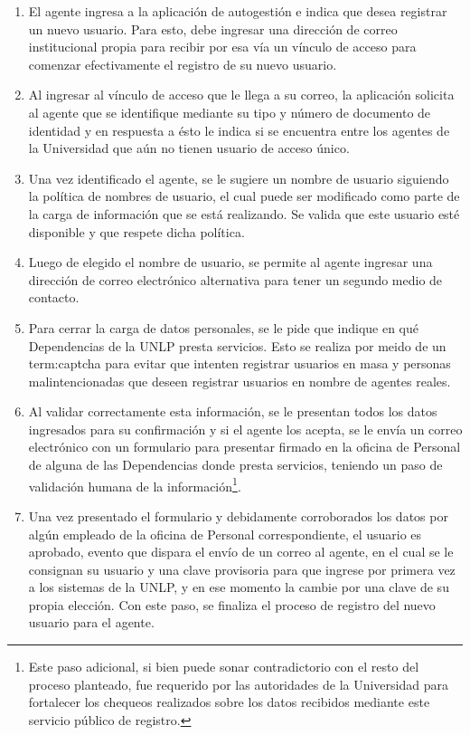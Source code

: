 \begin{enumerate}
  \item El agente ingresa a la aplicación de autogestión e indica que desea registrar un nuevo usuario. Para esto, debe ingresar una dirección de correo institucional propia para recibir por esa vía un vínculo de acceso para comenzar efectivamente el registro de su nuevo usuario.

  \item Al ingresar al vínculo de acceso que le llega a su correo, la aplicación solicita al agente que se identifique mediante su tipo y número de documento de identidad y en respuesta a ésto le indica si se encuentra entre los agentes de la Universidad que aún no tienen usuario de acceso único.

  \item Una vez identificado el agente, se le sugiere un nombre de usuario siguiendo la política de nombres de usuario, el cual puede ser modificado como parte de la carga de información que se está realizando. Se valida que este usuario esté disponible y que respete dicha política.

  \item Luego de elegido el nombre de usuario, se permite al agente ingresar una dirección de correo electrónico alternativa para tener un segundo medio de contacto.

  \item Para cerrar la carga de datos personales, se le pide que indique en qué Dependencias de la UNLP presta servicios. Esto se realiza por meido de un \gls{term:captcha} para evitar  que intenten registrar usuarios en masa y personas malintencionadas que deseen registrar usuarios en nombre de agentes reales.

  \item Al validar correctamente esta información, se le presentan todos los datos ingresados para su confirmación y si el agente los acepta, se le envía un correo electrónico con un formulario para presentar firmado en la oficina de Personal de alguna de las Dependencias donde presta servicios, teniendo un paso de validación humana de la información\footnote{Este paso adicional, si bien puede sonar contradictorio con el resto del proceso  planteado, fue requerido por las autoridades de la Universidad para fortalecer los chequeos realizados sobre los datos recibidos mediante este servicio público de registro.}.

  \item Una vez presentado el formulario y debidamente corroborados los datos por algún empleado de la oficina de Personal correspondiente, el usuario es aprobado, evento que dispara el envío de un correo al agente, en el cual se le consignan su usuario y una clave provisoria para que ingrese por primera vez a los sistemas de la UNLP, y en ese momento la cambie por una clave de su propia elección. Con este paso, se finaliza el proceso de registro del nuevo usuario para el agente.
\end{enumerate}

